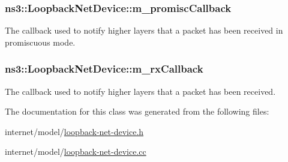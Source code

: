 \subsubsection[{\texorpdfstring{m\+\_\+promisc\+Callback}{m_promiscCallback}}]{ ns3\+::\+Loopback\+Net\+Device\+::m\+\_\+promisc\+Callback\hspace{0.3cm}{\ttfamily [private]}}\hypertarget{classns3_1_1LoopbackNetDevice_ac18a33947e9703ed786c83448348414c}{}\label{classns3_1_1LoopbackNetDevice_ac18a33947e9703ed786c83448348414c}
The callback used to notify higher layers that a packet has been received in promiscuous mode. 
\subsubsection[{\texorpdfstring{m\+\_\+rx\+Callback}{m_rxCallback}}]{ ns3\+::\+Loopback\+Net\+Device\+::m\+\_\+rx\+Callback\hspace{0.3cm}{\ttfamily [private]}}\hypertarget{classns3_1_1LoopbackNetDevice_a844fcc47c3dc1be07aed83c8ba70a7b0}{}\label{classns3_1_1LoopbackNetDevice_a844fcc47c3dc1be07aed83c8ba70a7b0}
The callback used to notify higher layers that a packet has been received. 

The documentation for this class was generated from the following files\+:\begin{DoxyCompactItemize}
\item 
internet/model/\hyperlink{loopback-net-device_8h}{loopback-\/net-\/device.\+h}\item 
internet/model/\hyperlink{loopback-net-device_8cc}{loopback-\/net-\/device.\+cc}\end{DoxyCompactItemize}
